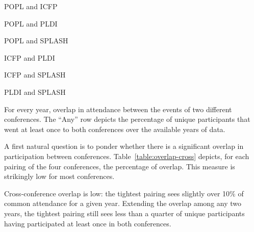 \begin{table}
  \centering
  \begin{subtable}[b]{0.3\textwidth}
    \centering
    \caption{POPL and ICFP}
  \end{subtable}
  \begin{subtable}[b]{0.3\textwidth}
    \centering
    \caption{POPL and PLDI}
  \end{subtable}
  \begin{subtable}[b]{0.3\textwidth}
    \centering
    \caption{POPL and SPLASH}
  \end{subtable}
  \begin{subtable}[b]{0.3\textwidth}
    \centering
    \caption{ICFP and PLDI}
  \end{subtable}
  \begin{subtable}[b]{0.3\textwidth}
    \centering
    \caption{ICFP and SPLASH}
  \end{subtable}
  \begin{subtable}[b]{0.3\textwidth}
    \centering
    \caption{PLDI and SPLASH}
  \end{subtable}
   \caption{For every year, overlap in attendance between the events of two
     different conferences. The ``Any'' row depicts the percentage of unique
     participants that went at least once to both conferences over the available
     years of data.}
  \label{table:overlap-cross}
\end{table}

A first natural question is to ponder whether there is a significant overlap
in participation between conferences.
Table~\ref{table:overlap-cross} depicts, for each pairing of the four
conferences, the percentage of overlap. This measure is strikingly
low for most conferences.

\begin{obs}
  Cross-conference overlap is low: the tightest pairing sees slightly over 10\%
  of common attendance for a given year. Extending the overlap among any two years,
  the tightest pairing still sees less than a quarter of unique participants having
  participated at least once in both conferences.
  \label{obs:overlap-cross}
\end{obs}

